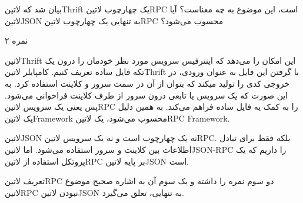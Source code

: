 
بیان شد که ‌لاتین{Thrift} یک چهارچوب ‌لاتین{RPC} است، این موضوع به چه معناست؟
آیا ‌لاتین{JSON} به تنهایی یک چهارچوب ‌لاتین{RPC} محسوب می‌شود؟

۲ نمره


‌لاتین{Thrift} این امکان را می‌دهد که اینترفیس سرویس مورد نظر خودمان را درون یک تکه فایل ساده تعریف کنیم.
کامپایلر ‌لاتین{Thrift} با گرفتن این فایل به عنوان ورودی، در خروجی کدی را تولید میکند که بتوان از آن در سمت سرور و کلاینت استفاده کرد.
به این صورت که یک سرویس یا تابعی درون سرور از طرف کلاینت فراخوانی می‌شود. پس یعنی یک سرویس ‌لاتین{RPC} را به کمک یه فایل ساده فراهم می‌کند.
به همین دلیل یک ‌لاتین{Framework} محسوب می‌شود، یک ‌لاتین{RPC Framework}.

‌لاتین{JSON} نه یک چهارچوب است و نه یک سرویس ‌لاتین{RPC}. بلکه فقط برای تبادل اطلاعات بین کلاینت و سرور استفاده می‌شود. اما ‌لاتین{JSON-RPC} را داریم که یک پروتکل استفاده از ‌لاتین{RPC}
بر پایه ‌لاتین{JSON} است.

تعریف ‌لاتین{RPC} دو سوم نمره را داشته و یک سوم آن به اشاره صحیح موضوع ‌لاتین{RPC} نبودن ‌لاتین{JSON} به تنهایی، تعلق می‌گیرد.



